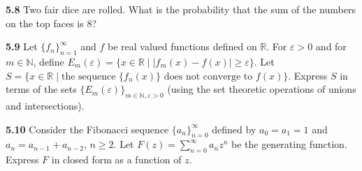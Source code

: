 \documentclass[11pt,a4paper]{article}
\newcommand{\N}{\mathbb{N}}
\newcommand{\R}{\mathbb{R}}
\newcommand{\qitem}[1]{\par\medskip\noindent\textbf{#1}\hspace{0.5em}}
\begin{document}
\qitem{5.8} Two fair dice are rolled. What is the probability that the sum of the numbers on the top faces is $8$?

\qitem{5.9} Let $\{f_n\}_{n=1}^{\infty}$ and $f$ be real valued functions defined on $\R$. For $\varepsilon > 0$ and for $m \in \N$, define $E_m(\varepsilon) = \{x \in \R \mid |f_m(x) - f(x)| \ge \varepsilon\}$. Let $S = \{x \in \R \mid \text{the sequence } \{f_n(x)\} \text{ does not converge to } f(x)\}$. Express $S$ in terms of the sets $\{E_m(\varepsilon)\}_{m \in \N, \varepsilon > 0}$ (using the set theoretic operations of unions and intersections).

\qitem{5.10} Consider the Fibonacci sequence $\{a_n\}_{n=0}^{\infty}$ defined by $a_0 = a_1 = 1$ and $a_n = a_{n-1} + a_{n-2}$, $n \ge 2$. Let $F(z) = \sum_{n=0}^{\infty} a_n z^n$ be the generating function. Express $F$ in closed form as a function of $z$.
\end{document}
